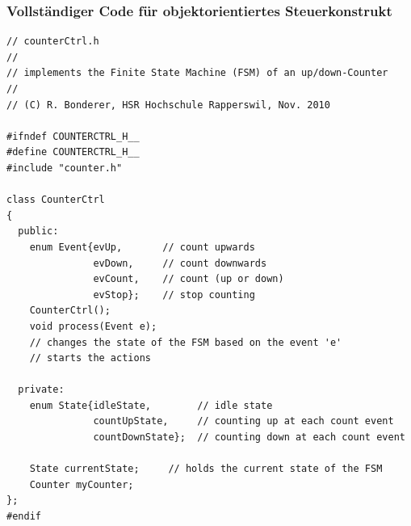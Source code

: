 \subsubsection{Vollständiger Code für objektorientiertes Steuerkonstrukt}
\label{subsec:oo_code}
\begin{lstlisting}[style=Cpp]
// counterCtrl.h
//
// implements the Finite State Machine (FSM) of an up/down-Counter
//
// (C) R. Bonderer, HSR Hochschule Rapperswil, Nov. 2010

#ifndef COUNTERCTRL_H__
#define COUNTERCTRL_H__
#include "counter.h"

class CounterCtrl
{
  public:
    enum Event{evUp,       // count upwards
               evDown,     // count downwards
               evCount,    // count (up or down)
               evStop};    // stop counting
    CounterCtrl();
    void process(Event e);
    // changes the state of the FSM based on the event 'e'
    // starts the actions

  private:
    enum State{idleState,        // idle state
               countUpState,     // counting up at each count event
               countDownState};  // counting down at each count event

    State currentState;     // holds the current state of the FSM
    Counter myCounter;
};
#endif
\end{lstlisting}

